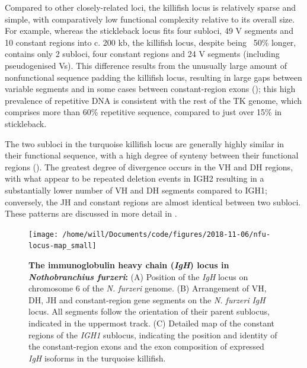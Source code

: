 	Compared to other closely-related loci, the killifish locus is relatively sparse and simple, with comparatively low functional complexity relative to its overall size. For example, whereas the stickleback locus fits four subloci, 49 V segments and 10 constant regions into c. 200 kb, the killifish locus, despite being ~50\% longer, contains only 2 subloci, four constant regions and 24 V segments (including pseudogenised Vs). This difference results from the unusually large amount of nonfunctional sequence padding the killifish locus, resulting in large gaps between variable segments and in some cases between constant-region exons (); this high prevalence of repetitive DNA is consistent with the rest of the TK genome, which comprises more than 60\% repetitive sequence, compared to just over 15\% in stickleback.
	
	The two subloci in the turquoise killifish locus are generally highly similar in their functional sequence, with a high degree of synteny between their functional regions (). The greatest degree of divergence occurs in the VH and DH regions, with what appear to be repeated deletion events in IGH2 resulting in a substantially lower number of VH and DH segments compared to IGH1; conversely, the JH and constant regions are almost identical between two subloci. These patterns are discussed in more detail in .
	
	
	\begin{figure}
	\centering
	\texttt{[image: /home/will/Documents/code/figures/2018-11-06/nfu-locus-map\_small]} %
			    \begin{subfigure}{0em}
        \label{fig:nfu-locus-map-a}
    \end{subfigure}
    \begin{subfigure}{0em}
        \label{fig:nfu-locus-map-b}
    \end{subfigure}
    \begin{subfigure}{0em}
        \label{fig:nfu-locus-map-c}
        \end{subfigure}
	\caption[The immunoglobulin heavy chain (\textit{IGH}) locus in \textit{Nothobranchius furzeri}]{\textbf{The immunoglobulin heavy chain (\textit{IgH}) locus in \textit{Nothobranchius furzeri}:} (A) Position of the \textit{IgH} locus on chromosome 6 of the \textit{N. furzeri} genome. (B) Arrangement of VH, DH, JH and constant-region gene segments on the \textit{N. furzeri} \textit{IgH} locus. All segments follow the orientation of their parent sublocus, indicated in the uppermost track. (C) Detailed map of the constant regions of the \textit{IGH1} sublocus, indicating the position and identity of the constant-region exons and the exon composition of expressed \textit{IgH} isoforms in the turquoise killifish.}
	\label{fig:nfu-locus-map}
	\end{figure}
	
